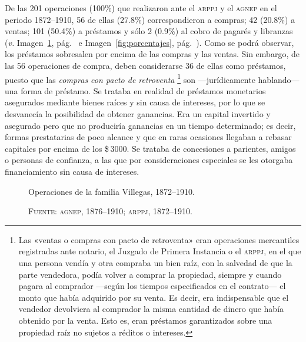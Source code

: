 \documentclass[14pt,twoside,final]{extbook} %
\let\oldfootnote\footnote
\renewcommand\footnote[1]{%
\oldfootnote{\hspace{1mm}#1}}
\begin{document}
De las 201 operaciones (100\%) que realizaron ante el \textsc{arppj} y el \textsc{agnep} en el periodo 1872--1910, 56 de ellas (27.8\%) correspondieron a compras; 42 (20.8\%) a ventas; 101 (50.4\%) a préstamos y sólo 2 (0.9\%) al cobro de pagarés y libranzas (\emph{v.} Imagen~\ref{fig:operaciones-villegas}, pág.~\pageref{fig:operaciones-villegas} e Imagen~\ref{fig:porcentajes}, pág.~\pageref{fig:porcentajes}). Como se podrá observar, los préstamos sobresalen por encima de las compras y las ventas. Sin embargo, de las 56 operaciones de compra, deben considerarse 36 de ellas como préstamos, puesto que las \emph{compras con pacto de retroventa}\footnote{Las «ventas o compras con pacto de retroventa» eran operaciones mercantiles registradas ante notario, el Juzgado de Primera Instancia o el \textsc{arppj}, en el que una persona vendía y otra compraba un bien raíz, con la salvedad de que la parte vendedora, podía volver a comprar la propiedad, siempre y cuando pagara al comprador ---según los tiempos especificados en el contrato--- el monto que había adquirido por su venta. Es decir, era indispensable que el vendedor devolviera al comprador la misma cantidad de dinero que había obtenido por la venta. Esto es, eran préstamos garantizados sobre una propiedad raíz no sujetos a réditos o intereses.} son ---jurídicamente hablando--- una forma de préstamo. Se trataba en realidad de préstamos monetarios asegurados mediante bienes raíces y sin causa de intereses, por lo que se desvanecía la posibilidad de obtener ganancias. Era un capital invertido y asegurado pero que no produciría ganancias en un tiempo determinado; es decir, formas prestatarias de poco alcance y que en raras ocasiones llegaban a rebasar capitales por encima de los \$\,3000. Se trataba de concesiones a parientes, amigos o personas de confianza, a las que por consideraciones especiales se les otorgaba financiamiento sin causa de intereses.
\begin{figure}
\centering
\caption[Operaciones de la familia Villegas, 1872--1910]{Operaciones de la familia Villegas, 1872--1910.}
\caption*{\textsc{Fuente:} \textsc{agnep}, 1876--1910; \textsc{arppj}, 1872--1910.}
\label{fig:operaciones-villegas}
\end{figure}
\end{document}
